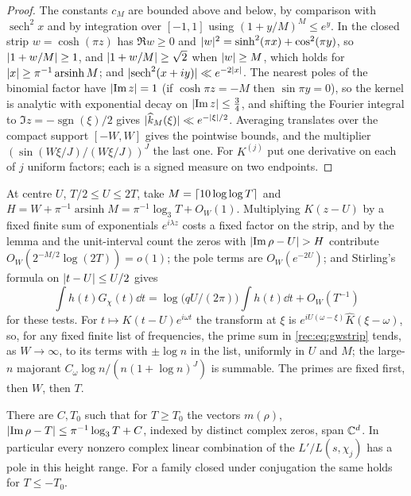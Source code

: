 \begin{proof}
The constants $c_M$ are bounded above and below, by comparison with $\operatorname{sech}^2x$ and by integration
over $[-1,1]$ using $(1+y/M)^M\le e^y$. In the closed strip $w=\cosh(\pi z)$ has $\Re w\ge0$ and
$\lvert w\rvert^2=\sinh^2(\pi x)+\cos^2(\pi y)$, so $\lvert1+w/M\rvert\ge1$, and $\lvert1+w/M\rvert\ge\sqrt2$ when $\lvert w\rvert\ge M$,
which holds for $\lvert x\rvert\ge\pi^{-1}\operatorname{arsinh}M$; and $\lvert\operatorname{sech}^2(x+iy)\rvert\ll e^{-2\lvert x\rvert}$. The nearest
poles of the binomial factor have $\lvert\operatorname{Im} z\rvert=1$ (if $\cosh\pi z=-M$ then $\sin\pi y=0$), so the
kernel is analytic with exponential decay on $\lvert\operatorname{Im} z\rvert\le\tfrac34$, and shifting the Fourier
integral to $\Im z=-\operatorname{sgn}(\xi)/2$ gives $\lvert\widehat k_M(\xi)\rvert\ll e^{-\lvert\xi\rvert/2}$. Averaging translates
over the compact support $[-W,W]$ gives the pointwise bounds, and the multiplier
$(\sin(W\xi/J)/(W\xi/J))^J$ the last one. For $K^{(j)}$ put one derivative on each of $j$ uniform
factors; each is a signed measure on two endpoints.
\end{proof}

At centre $U$, $T/2\le U\le2T$, take $M=\lceil10\log\log T\rceil$ and $H=W+\pi^{-1}\operatorname{arsinh}M=\pi^{-1}\log_3T+O_W(1)$.
Multiplying $K(z-U)$ by a fixed finite sum of exponentials $e^{i\lambda z}$ costs a fixed factor on
the strip, and by the lemma and the unit-interval count the zeros with $\lvert\operatorname{Im}\rho-U\rvert>H$
contribute $O_W(2^{-M/2}\log(2T))=o(1)$; the pole terms are $O_W(e^{-2U})$; and Stirling's formula on
$\lvert t-U\rvert\le U/2$ gives
\begin{equation}\label{rec:eq:binomgamma}
 \int h(t)G_\chi(t)\dd t=\log\bigl(qU/(2\pi)\bigr)\int h(t)\dd t+O_W(T^{-1})
\end{equation}
for these tests. For $t\mapsto K(t-U)e^{i\omega t}$ the transform at $\xi$ is $e^{iU(\omega-\xi)}\widehat K(\xi-\omega)$,
so, for any fixed finite list of frequencies, the prime sum in \eqref{rec:eq:gwstrip} tends, as
$W\to\infty$, to its terms with $\pm\log n$ in the list, uniformly in $U$ and $M$; the large-$n$
majorant $C_\omega\log n/(n(1+\log n)^J)$ is summable. The primes are fixed first, then $W$, then $T$.

\begin{theorem}\label{rec:thm:localrank}
There are $C,T_0$ such that for $T\ge T_0$ the vectors $m(\rho)$, $\lvert\operatorname{Im}\rho-T\rvert\le\pi^{-1}\log_3T+C$,
indexed by distinct complex zeros, span $\mathbb{C}^d$. In particular every nonzero complex linear
combination of the $L'/L(s,\chi_j)$ has a pole in this height range. For a family closed under
conjugation the same holds for $T\le-T_0$.
\end{theorem}


